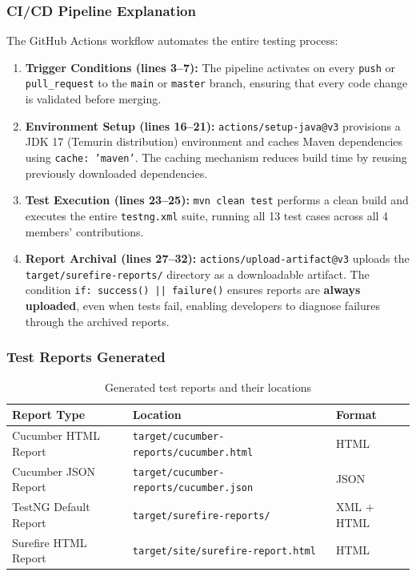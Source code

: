 \documentclass[12pt,a4paper]{article}
\begin{document}
\subsubsection{CI/CD Pipeline Explanation}

The GitHub Actions workflow automates the entire testing process:

\begin{enumerate}
    \item \textbf{Trigger Conditions (lines 3--7):} The pipeline activates on every \texttt{push} or \texttt{pull\_request} to the \texttt{main} or \texttt{master} branch, ensuring that every code change is validated before merging.

    \item \textbf{Environment Setup (lines 16--21):} \texttt{actions/setup-java@v3} provisions a JDK 17 (Temurin distribution) environment and caches Maven dependencies using \texttt{cache: 'maven'}. The caching mechanism reduces build time by reusing previously downloaded dependencies.

    \item \textbf{Test Execution (lines 23--25):} \texttt{mvn clean test} performs a clean build and executes the entire \texttt{testng.xml} suite, running all 13 test cases across all 4 members' contributions.

    \item \textbf{Report Archival (lines 27--32):} \texttt{actions/upload-artifact@v3} uploads the \texttt{target/surefire-reports/} directory as a downloadable artifact. The condition \texttt{if: success() || failure()} ensures reports are \textbf{always uploaded}, even when tests fail, enabling developers to diagnose failures through the archived reports.
\end{enumerate}

\subsubsection{Test Reports Generated}

\begin{table}[H]
\centering
\begin{tabular}{lll}
    \toprule
    \textbf{Report Type} & \textbf{Location} & \textbf{Format} \\
    \midrule
    Cucumber HTML Report & \texttt{target/cucumber-reports/cucumber.html} & HTML \\
    Cucumber JSON Report & \texttt{target/cucumber-reports/cucumber.json} & JSON \\
    TestNG Default Report & \texttt{target/surefire-reports/} & XML + HTML \\
    Surefire HTML Report & \texttt{target/site/surefire-report.html} & HTML \\
    \bottomrule
\end{tabular}
\caption{Generated test reports and their locations}
\end{table}
\end{document}
